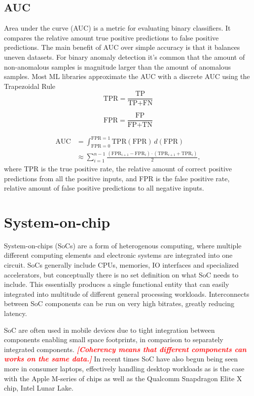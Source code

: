 \documentclass[12pt,a4paper,english
]{tunithesis}
\newcommand{\fixthis}[1]{\textbf{\textit{\textcolor{red}{[#1]}}}}
\begin{document}
\subsection{AUC}
Area under the curve (AUC) is a metric for evaluating binary classifiers. It compares the relative amount true positive predictions to false positive predictions.
The main benefit of AUC over simple accuracy is that it balances uneven datasets. For binary anomaly detection it's common that the amount of non-anomalous samples is magnitude larger than the amount of anomalous samples.
Most ML libraries approximate the AUC with a discrete AUC using the Trapezoidal Rule~\cite{paszke_pytorch_2019}
\begin{equation}
\text{TPR} =  \frac{\text{TP}}{\text{TP} + \text{FN}}
\end{equation}

\begin{equation}
\text{FPR} = \frac{\text{FP}}{\text{FP} + \text{TN}}
\end{equation}

\begin{align}
  \text{AUC} & = \int_{\text{FPR}=0}^{\text{FPR}=1} \text{TPR}(\text{FPR}) \, d(\text{FPR}) \\
  & \approx \sum_{i=1}^{n-1} \frac{(\text{FPR}_{i+1} - \text{FPR}_i) \cdot (\text{TPR}_{i+1} + \text{TPR}_i)}{2},
\end{align}
where TPR is the true positive rate, the relative amount of correct positive predictions from all the positive inputs, and FPR is the false positive rate, relative amount of false positive predictions to all negative inputs.



\section{System-on-chip}
System-on-chips (SoCs) are a form of heterogenous computing, where multiple different computing elements and electronic systems are integrated into one circuit.
SoCs generally include CPUs, memories, IO interfaces and specialized accelerators, but conceptually there is no set definition on what SoC needs to include.
This essentially produces a single functional entity that can easily integrated into multitude of different general processing workloads.
Interconnects between SoC components can be run on very high bitrates, greatly reducing latency.

SoC are often used in mobile devices due to tight integration between components enabling small space footprints, in comparison to separately integrated components.
\fixthis{Coherency means that different components can works on the same data.}
In recent times SoC have also begun being seen more in consumer laptops, effectively handling desktop workloads as is the case with the Apple M-series of chips as well as the Qualcomm Snapdragon Elite X chip, Intel Lunar Lake.
\end{document}
